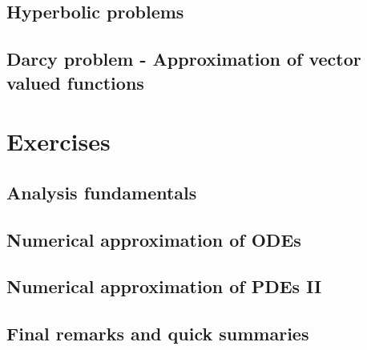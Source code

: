 \documentclass[palatino,twoside]{epflnotes}
\newif\ifincludefirstsemester
\begin{document}
\chapter{Hyperbolic problems}


\chapter{Darcy problem - Approximation of vector valued functions}
\ifincludefirstsemester\fi

\appendix
\part{Exercises}

\chapter{Analysis fundamentals}


\chapter{Numerical approximation of ODEs}


\chapter{Numerical approximation of PDEs II}


\backmatter

\chapter{Final remarks and quick summaries}





\printindex
\printtheorems
\end{document}
